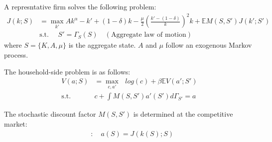 A represntative firm solves the following problem:
\begin{align*}
  J(k;S) &= \max_{k'} Ak^{\alpha}  -k' + (1-\delta)k - \frac{\mu}{2}\left(\frac{k'-(1-\delta)}{k}\right)^{2}k + \mathbb{E}M(S,S')J(k';S')
  \\
  & \text{s.t. }\quad S' = \Gamma_{S}(S) \quad(\text{Aggregate law of motion})
\end{align*}
where $S = \{K,A,\mu\}$ is the aggregate state. $A$ and $\mu$ follow an exogenous Markov process.

The household-side problem is as follows:
\begin{align*}
  V(a;S) &= \max_{c,a'}\text{ } log(c) + \beta \mathbb{E}V(a';S')
  \\
  \text{s.t.}\quad& c + \int M(S,S') a'(S') d\Gamma_{S'} =  a
\end{align*}

The stochastic discount factor $M(S,S')$ is determined at the competitive market:
\begin{align*}
  [M]&:\quad a(S) = J(k(S);S)
\end{align*}

